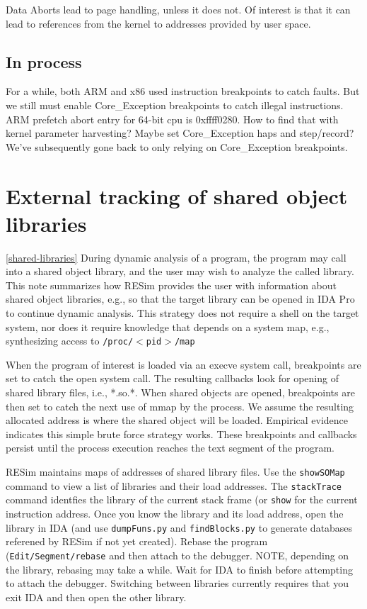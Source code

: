 \documentclass[titlepage]{article}
\begin{document}
\begin{appendices}
Data Aborts lead to page handling, unless it does not.  Of interest is that it can lead to references from the kernel to addresses provided by user space.

\subsection{In process}
For a while, both ARM and x86 used instruction breakpoints to catch faults.  But we still must enable Core\_Exception breakpoints to catch illegal instructions.
ARM prefetch abort entry for 64-bit cpu is 0xffff0280.  How to find that with kernel parameter harvesting?  Maybe set Core\_Exception haps and step/record?
We've subsequently gone back to only relying on Core\_Exception breakpoints.

\section{External tracking of shared object libraries}
\ref{shared-libraries}
During dynamic analysis of a program, the program may call into a shared object library, and the user may wish to analyze the called library.  This note summarizes how RESim provides the user with information about shared object libraries, e.g., so that the target library can be opened in IDA Pro to continue dynamic analysis.  This strategy does not require a shell on the target system, nor does it require knowledge that depends on a system map, e.g., 
synthesizing access to {\tt /proc/$<$pid$>$/map}

When the program of interest is loaded via an execve system call, breakpoints are set to catch the open system call.  The resulting callbacks look for opening of shared library files, i.e., *.so.*.   When shared objects are opened, breakpoints are then set to catch the next use of mmap by the process.  We assume the resulting allocated address is where the shared object will be loaded.  Empirical evidence indicates this simple brute force strategy works.  These breakpoints and callbacks persist until the process execution reaches the text segment of the program.

RESim maintains maps of addresses of shared library files.  Use the {\tt showSOMap} command to view a list of libraries and their load
addresses.  The {\tt stackTrace} command identfies the library of the current stack frame (or {\tt show} for the current instruction address.
Once you know the library and its load address, open the library in IDA (and use {\tt dumpFuns.py} and {\tt findBlocks.py} to generate databases
referened by RESim if not yet created). Rebase the program ({\tt Edit/Segment/rebase} and then attach to the debugger. NOTE, depending on the library, rebasing may take a while.
Wait for IDA to finish before attempting to attach the debugger.
Switching between libraries currently requires that you exit IDA and then open the other library.


\end{appendices}
\end{document}

